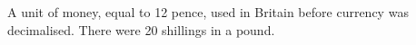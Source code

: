 A unit of money, equal to 12 pence, used in Britain before currency
was decimalised. There were 20 shillings in a pound.